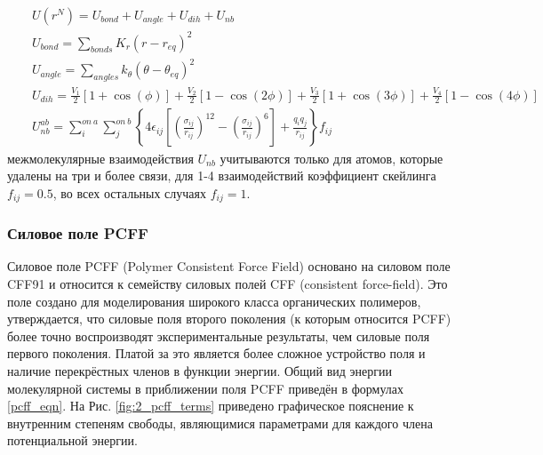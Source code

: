 \begin{eqnarray}
&&U(r^N)=U_{bond}+U_{angle}+U_{dih}+U_{nb} \label{opls_ff_eqn}\\
&&U_{bond}=\sum_{bonds}K_r (r-r_{eq})^2\nonumber\\
&&U_{angle} = \sum_{angles} k_\theta \left ( \theta - \theta_{eq} \right )^2\nonumber\\
&&U_{dih} = \frac {V_1} {2} \left [ 1 + \cos \left ( \phi \right ) \right ] 
                + \frac {V_2} {2} \left [ 1 - \cos \left ( 2 \phi \right ) \right ] 
                + \frac {V_3} {2} \left [ 1 + \cos \left ( 3 \phi \right ) \right ] 
                + \frac {V_4} {2} \left [ 1 - \cos \left ( 4 \phi \right ) \right ]\nonumber\\
&&U_{nb}^{ab} = \sum_{i} ^{on\ a} \sum_{j} ^{on\ b} \left \{
                    4 \epsilon_{ij} \left [ \left( \frac {\sigma_{ij}}{r_{ij}} \right )^{12} 
                    - \left ( \frac {\sigma_{ij}}{r_{ij}} \right )^6 \right ]  + \frac {q_iq_j} {r_{ij}}
                   \right \} f_{ij}\nonumber
\end{eqnarray}
межмолекулярные взаимодействия $U_{nb}$ учитываются только для атомов, которые удалены на три и более связи, для 1-4 взаимодействий коэффициент скейлинга $f_{ij}=0.5$, во всех остальных случаях $f_{ij}=1$.

\subsubsection{Силовое поле PCFF}
Силовое поле PCFF (Polymer Consistent Force Field) \cite{pcff_sun_1994} основано на силовом поле CFF91 и относится к семейству силовых полей CFF (consistent force-field). Это поле создано для моделирования широкого класса органических полимеров, утверждается, что силовые поля второго поколения (к которым относится PCFF) более точно воспроизводят экспериментальные результаты, чем силовые поля первого поколения. Платой за это является более сложное устройство поля и наличие перекрёстных членов в функции энергии. Общий вид энергии молекулярной системы в приближении поля PCFF приведён в формулах \ref{pcff_eqn}. На Рис. \ref{fig:2_pcff_terms} приведено графическое пояснение к внутренним степеням свободы, являющимися параметрами для каждого члена потенциальной энергии.

